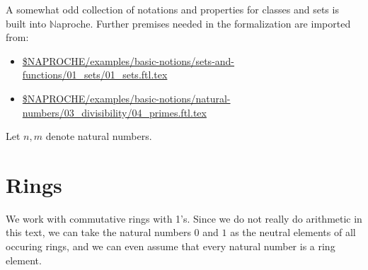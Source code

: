 \documentclass{article}
\newcommand{\Naproche}{$\mathbb{N}$aproche}
\begin{document}
A somewhat odd collection of notations and properties for classes and sets is
built into \Naproche{}.
Further premises needed in the formalization are imported from:

\begin{itemize}
  \item \url{$NAPROCHE/examples/basic-notions/sets-and-functions/01_sets/01_sets.ftl.tex}
  \item \url{$NAPROCHE/examples/basic-notions/natural-numbers/03_divisibility/04_primes.ftl.tex}
\end{itemize}


\begin{forthel}
  Let $n,m$ denote natural numbers.
\end{forthel}


\section{Rings}

We work with commutative rings with 1's. Since we
do not really do arithmetic in this text, we can take the natural numbers
$0$ and $1$ as the neutral elements of all occuring rings, and
we can even assume that every natural number is a ring element.
\end{document}
